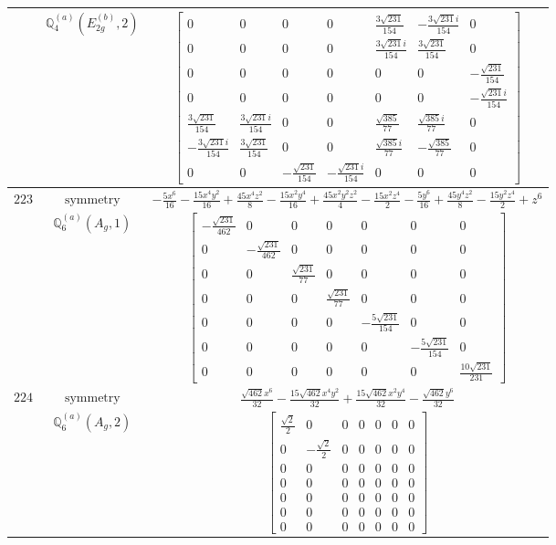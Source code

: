 \documentclass[fleqn,8pt,landscape]{jsarticle}
\begin{document}
\begin{longtable}{ccc}
$  $ & $ \mathbb{Q}_{4}^{(a)}(E_{2g}^{(b)},2) $ & $ \begin{bmatrix} 0 & 0 & 0 & 0 & \frac{3 \sqrt{231}}{154} & - \frac{3 \sqrt{231} i}{154} & 0 \\ 0 & 0 & 0 & 0 & \frac{3 \sqrt{231} i}{154} & \frac{3 \sqrt{231}}{154} & 0 \\ 0 & 0 & 0 & 0 & 0 & 0 & - \frac{\sqrt{231}}{154} \\ 0 & 0 & 0 & 0 & 0 & 0 & - \frac{\sqrt{231} i}{154} \\ \frac{3 \sqrt{231}}{154} & \frac{3 \sqrt{231} i}{154} & 0 & 0 & \frac{\sqrt{385}}{77} & \frac{\sqrt{385} i}{77} & 0 \\ - \frac{3 \sqrt{231} i}{154} & \frac{3 \sqrt{231}}{154} & 0 & 0 & \frac{\sqrt{385} i}{77} & - \frac{\sqrt{385}}{77} & 0 \\ 0 & 0 & - \frac{\sqrt{231}}{154} & - \frac{\sqrt{231} i}{154} & 0 & 0 & 0 \end{bmatrix} $ \\ \hline
$ 223 $ & $ \text{symmetry} $ & $ - \frac{5 x^{6}}{16} - \frac{15 x^{4} y^{2}}{16} + \frac{45 x^{4} z^{2}}{8} - \frac{15 x^{2} y^{4}}{16} + \frac{45 x^{2} y^{2} z^{2}}{4} - \frac{15 x^{2} z^{4}}{2} - \frac{5 y^{6}}{16} + \frac{45 y^{4} z^{2}}{8} - \frac{15 y^{2} z^{4}}{2} + z^{6} $ \\
$  $ & $ \mathbb{Q}_{6}^{(a)}(A_{g},1) $ & $ \begin{bmatrix} - \frac{\sqrt{231}}{462} & 0 & 0 & 0 & 0 & 0 & 0 \\ 0 & - \frac{\sqrt{231}}{462} & 0 & 0 & 0 & 0 & 0 \\ 0 & 0 & \frac{\sqrt{231}}{77} & 0 & 0 & 0 & 0 \\ 0 & 0 & 0 & \frac{\sqrt{231}}{77} & 0 & 0 & 0 \\ 0 & 0 & 0 & 0 & - \frac{5 \sqrt{231}}{154} & 0 & 0 \\ 0 & 0 & 0 & 0 & 0 & - \frac{5 \sqrt{231}}{154} & 0 \\ 0 & 0 & 0 & 0 & 0 & 0 & \frac{10 \sqrt{231}}{231} \end{bmatrix} $ \\ \hline
$ 224 $ & $ \text{symmetry} $ & $ \frac{\sqrt{462} x^{6}}{32} - \frac{15 \sqrt{462} x^{4} y^{2}}{32} + \frac{15 \sqrt{462} x^{2} y^{4}}{32} - \frac{\sqrt{462} y^{6}}{32} $ \\
$  $ & $ \mathbb{Q}_{6}^{(a)}(A_{g},2) $ & $ \begin{bmatrix} \frac{\sqrt{2}}{2} & 0 & 0 & 0 & 0 & 0 & 0 \\ 0 & - \frac{\sqrt{2}}{2} & 0 & 0 & 0 & 0 & 0 \\ 0 & 0 & 0 & 0 & 0 & 0 & 0 \\ 0 & 0 & 0 & 0 & 0 & 0 & 0 \\ 0 & 0 & 0 & 0 & 0 & 0 & 0 \\ 0 & 0 & 0 & 0 & 0 & 0 & 0 \\ 0 & 0 & 0 & 0 & 0 & 0 & 0 \end{bmatrix} $ \\ \hline

\end{longtable}
\end{document}
